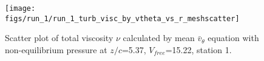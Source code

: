 \begin{figure}[H]
\centering
\texttt{[image: figs/run\_1/run\_1\_turb\_visc\_by\_vtheta\_vs\_r\_meshscatter]}
\caption{Scatter plot of total viscosity $\nu$ calculated by mean $\bar{v}_{\theta}$ equation with non-equilibrium pressure at $z/c$=5.37, $V_{free}$=15.22, station 1.}
\label{fig:run_1_turb_visc_by_vtheta_vs_r_meshscatter}
\end{figure}


